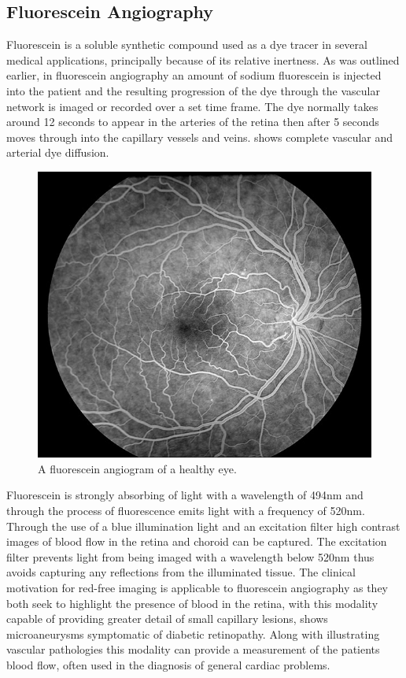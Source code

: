 \subsection{Fluorescein Angiography}

Fluorescein is a soluble synthetic compound used as a dye tracer in
several medical applications, principally because of its relative inertness.
As was outlined earlier, in fluorescein angiography an amount of sodium
fluorescein is injected into the patient and the resulting progression of the
dye through the vascular network is imaged or recorded over a set time
frame. The dye normally takes around 12 seconds to appear in the arteries
of the retina then after 5 seconds moves through into the capillary vessels
and veins.  shows complete vascular and arterial dye diffusion.

\begin{figure}[H]
\centering
\includegraphics{figures/fluoresceinangio}
\caption{A fluorescein angiogram of a healthy eye.}
\label{fig:fluor}
   \end{figure}

Fluorescein is strongly absorbing of light with a wavelength of 494nm and
through the process of fluorescence emits light with a frequency of 520nm.
Through the use of a blue illumination light and an excitation filter high
contrast images of blood flow in the retina and choroid can be captured.
The excitation filter prevents light from being imaged with a wavelength
below 520nm thus avoids capturing any reflections from the illuminated tissue.\cite{4_bennett_2015}
The clinical motivation for red-free imaging is applicable
to fluorescein angiography as they both seek to highlight the presence of blood
in the retina, with this modality capable of providing greater detail of small
capillary lesions,  shows microaneurysms symptomatic of diabetic
retinopathy. Along with illustrating vascular pathologies this modality can provide
a measurement of the patients blood flow, often used in the diagnosis of general
cardiac problems.

